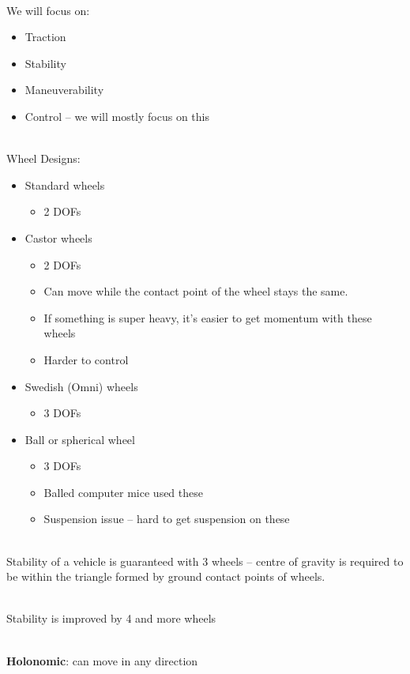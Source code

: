 \documentclass[13pt]{article}
\begin{document}
\hfill \\
\noindent
We will focus on:
\begin{itemize}
	\item Traction
	\item Stability
	\item Maneuverability
	\item Control -- we will mostly focus on this
\end{itemize}

\hfill \\
\noindent
Wheel Designs:
\begin{itemize}
	\item Standard wheels
	\begin{itemize}
		\item 2 DOFs
	\end{itemize}
	\item Castor wheels
	\begin{itemize}
		\item 2 DOFs
		\item Can move while the contact point of the wheel stays the same.
		\item If something is super heavy, it's easier to get momentum with these wheels
		\item Harder to control
	\end{itemize}
	\item Swedish (Omni) wheels
	\begin{itemize}
		\item 3 DOFs
	\end{itemize}
	\item Ball or spherical wheel
	\begin{itemize}
		\item 3 DOFs
		\item Balled computer mice used these
		\item Suspension issue -- hard to get suspension on these
	\end{itemize}
\end{itemize}

\hfill \\
\noindent
Stability of a vehicle is guaranteed with 3 wheels -- centre of gravity is required to be within the triangle formed by
ground contact points of wheels.

\hfill\\
\noindent
Stability is improved by 4 and more wheels

\hfill \\
\noindent
\textbf{Holonomic}: can move in any direction
\end{document}
